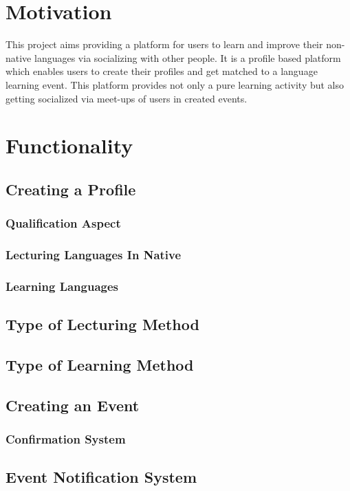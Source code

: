 \lstset{style=mystyle}
\usepackage{amsmath}


\pagestyle{empty} %

\titleBC %
\newpage
\section{Motivation}
This project aims providing a platform for users to learn and improve their non-native languages via socializing with other  people. It is a profile based platform which enables users to create their profiles and get matched to a language learning event. This platform provides not only a pure learning activity but also getting socialized via meet-ups of users in created events.
\section{Functionality}
\subsection{Creating a Profile}
 \subsubsection{Qualification Aspect}
 \subsubsection{Lecturing Languages In Native}
 \subsubsection{Learning Languages}
 \subsection{Type of Lecturing Method}
 \subsection{Type of Learning Method}
\subsection{Creating an Event}
\subsubsection{Confirmation System} 
\subsection{Event Notification System}
